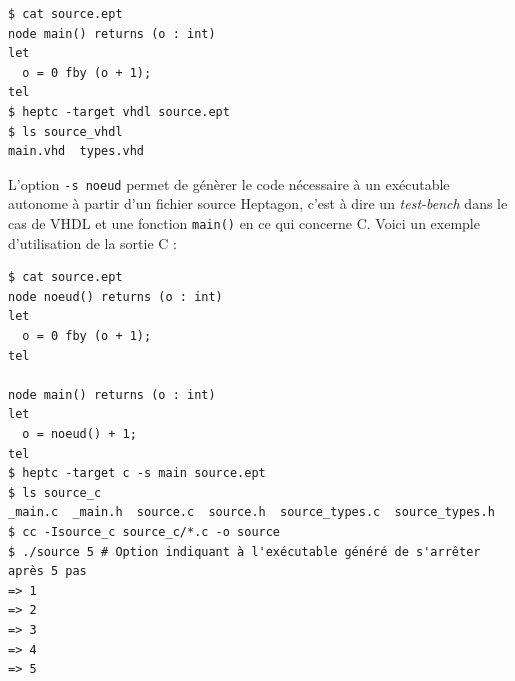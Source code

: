 \documentclass[9pt,a4paper]{article}
\newcommand{\LANG}{Heptagon}
\begin{document}
\begin{verbatim}
$ cat source.ept
node main() returns (o : int)
let
  o = 0 fby (o + 1);
tel
$ heptc -target vhdl source.ept
$ ls source_vhdl
main.vhd  types.vhd
\end{verbatim}

L'option \verb/-s noeud/ permet de génèrer le code nécessaire à un exécutable
autonome à partir d'un fichier source \LANG{}, c'est à dire un
\textit{test-bench} dans le cas de VHDL et une fonction \verb/main()/ en ce qui
concerne C. Voici un exemple d'utilisation de la sortie C :

\begin{verbatim}
$ cat source.ept
node noeud() returns (o : int)
let
  o = 0 fby (o + 1);
tel

node main() returns (o : int)
let
  o = noeud() + 1;
tel
$ heptc -target c -s main source.ept
$ ls source_c
_main.c  _main.h  source.c  source.h  source_types.c  source_types.h
$ cc -Isource_c source_c/*.c -o source
$ ./source 5 # Option indiquant à l'exécutable généré de s'arrêter après 5 pas
=> 1
=> 2
=> 3
=> 4
=> 5
\end{verbatim}



\end{document}
